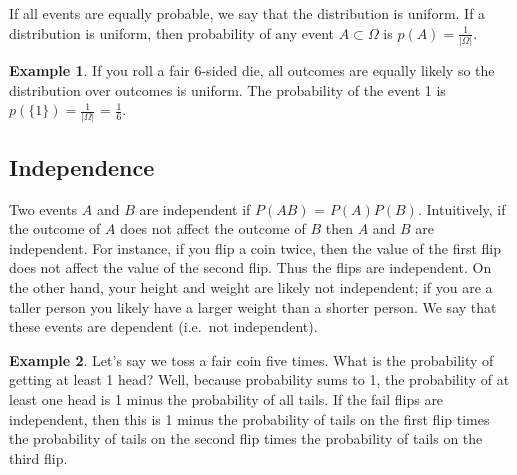 \documentclass[]{article}
\theoremstyle{definition}
\newtheorem{exmp}{Example}[section]
\begin{document}
If all events are equally probable, we say that the distribution is uniform. If a distribution is uniform, then probability of any event $A \subset \Omega$ is $p(A)=\frac{1}{\vert \Omega \vert}$.

\begin{exmp}
If you roll a fair 6-sided die, all outcomes are equally likely so the distribution over outcomes is uniform. The probability of the event 1 is $p(\{1\})=\frac{1}{\vert \Omega \vert}$ = $\frac{1}{6}$.
\end{exmp}

\subsection{Independence}

Two events $A$ and $B$ are independent if $P(AB)$ = $P(A)P(B)$. Intuitively, if the outcome of $A$ does not affect the outcome of $B$ then $A$ and $B$ are independent. For instance, if you flip a coin twice, then the value of the first flip does not affect the value of the second flip. Thus the flips are independent. On the other hand, your height and weight are likely not independent; if you are a taller person you likely have a larger weight than a shorter person. We say that these events are dependent (i.e.\ not independent).

\begin{exmp}
Let's say we toss a fair coin five times. What is the probability of getting at least 1 head? Well, because probability sums to 1, the probability of at least one head is 1 minus the probability of all tails. If the fail flips are independent, then this is 1 minus the probability of tails on the first flip times the probability of tails on the second flip times the probability of tails on the third flip. 
\end{exmp}
\end{document}
